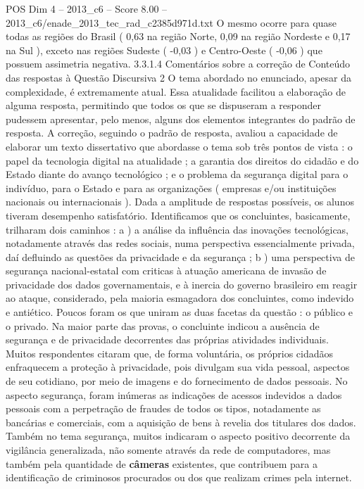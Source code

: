 \begin{textsample}{POS Dim 4 – 2013\_c6 – Score 8.00 – 2013\_c6/enade\_2013\_tec\_rad\_c2385d971d.txt}
O mesmo ocorre para quase todas as regiões do Brasil ( 0,63 na região Norte, 0,09 na região Nordeste e 0,17 na Sul ), exceto nas regiões Sudeste ( -0,03 ) e Centro-Oeste ( -0,06 ) que possuem assimetria negativa. 3.3.1.4 Comentários sobre a correção de Conteúdo das respostas à Questão Discursiva 2 O tema abordado no enunciado, apesar da complexidade, é extremamente atual.
Essa atualidade facilitou a elaboração de alguma resposta, permitindo que todos os que se dispuseram a responder pudessem apresentar, pelo menos, alguns dos elementos integrantes do padrão de resposta.
A correção, seguindo o padrão de resposta, avaliou a capacidade de elaborar um texto dissertativo que abordasse o tema sob três pontos de vista : o papel da tecnologia digital na atualidade ; a garantia dos direitos do cidadão e do Estado diante do avanço tecnológico ; e o problema da segurança digital para o indivíduo, para o Estado e para as organizações ( empresas e/ou instituições nacionais ou internacionais ).
Dada a amplitude de respostas possíveis, os alunos tiveram desempenho satisfatório.
Identificamos que os concluintes, basicamente, trilharam dois caminhos : a ) a análise da influência das inovações tecnológicas, notadamente através das redes sociais, numa perspectiva essencialmente privada, daí defluindo as questões da privacidade e da segurança ; b ) uma perspectiva de segurança nacional-estatal com criticas à atuação americana de invasão de privacidade dos dados governamentais, e à inercia do governo brasileiro em reagir ao ataque, considerado, pela maioria esmagadora dos concluintes, como indevido e antiético.
Poucos foram os que uniram as duas facetas da questão : o público e o privado.
Na maior parte das provas, o concluinte indicou a ausência de segurança e de privacidade decorrentes das próprias atividades individuais.
Muitos respondentes citaram que, de forma voluntária, os próprios cidadãos enfraquecem a proteção à privacidade, pois divulgam sua vida pessoal, aspectos de seu cotidiano, por meio de imagens e do fornecimento de dados pessoais.
No aspecto segurança, foram inúmeras as indicações de acessos indevidos a dados pessoais com a perpetração de fraudes de todos os tipos, notadamente as bancárias e comerciais, com a aquisição de bens à revelia dos titulares dos dados.
Também no tema segurança, muitos indicaram o aspecto positivo decorrente da vigilância generalizada, não somente através da rede de computadores, mas também pela quantidade de \textbf{câmeras} existentes, que contribuem para a identificação de criminosos procurados ou dos que realizam crimes pela internet.

\end{textsample}
